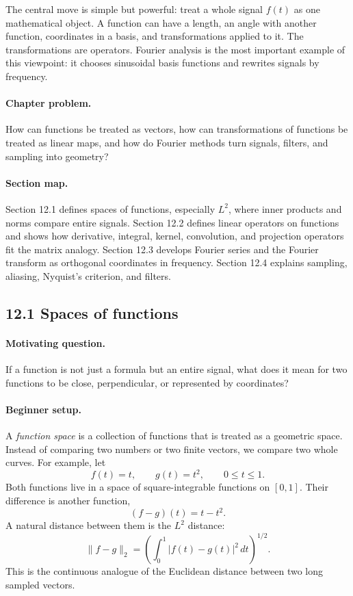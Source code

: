 The central move is simple but powerful: treat a whole signal \(f(t)\) as one mathematical object. A function can have a length, an angle with another function, coordinates in a basis, and transformations applied to it. The transformations are operators. Fourier analysis is the most important example of this viewpoint: it chooses sinusoidal basis functions and rewrites signals by frequency.

\paragraph{Chapter problem.}
How can functions be treated as vectors, how can transformations of functions be treated as linear maps, and how do Fourier methods turn signals, filters, and sampling into geometry?

\paragraph{Section map.}
Section 12.1 defines spaces of functions, especially \(L^2\), where inner products and norms compare entire signals. Section 12.2 defines linear operators on functions and shows how derivative, integral, kernel, convolution, and projection operators fit the matrix analogy. Section 12.3 develops Fourier series and the Fourier transform as orthogonal coordinates in frequency. Section 12.4 explains sampling, aliasing, Nyquist's criterion, and filters.

\subsection{12.1 Spaces of functions}

\paragraph{Motivating question.}
If a function is not just a formula but an entire signal, what does it mean for two functions to be close, perpendicular, or represented by coordinates?

\paragraph{Beginner setup.}
A \emph{function space} is a collection of functions that is treated as a geometric space. Instead of comparing two numbers or two finite vectors, we compare two whole curves. For example, let
\[
f(t)=t,\qquad g(t)=t^2,\qquad 0\leq t\leq 1.
\]
Both functions live in a space of square-integrable functions on \([0,1]\). Their difference is another function,
\[
(f-g)(t)=t-t^2.
\]
A natural distance between them is the \(L^2\) distance:
\[
\|f-g\|_2
=\left(\int_0^1 |f(t)-g(t)|^2\,dt\right)^{1/2}.
\]
This is the continuous analogue of the Euclidean distance between two long sampled vectors.

